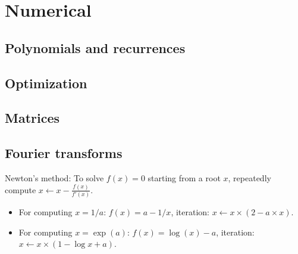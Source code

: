 \chapter{Numerical}

\section{Polynomials and recurrences}

\section{Optimization}

\section{Matrices}

\section{Fourier transforms}
	Newton's method: To solve $f(x) = 0$ starting from a root $x$, repeatedly compute
	$x \leftarrow x - \frac{f(x)}{f'(x)}$.
	\begin{itemize}
	  \item For computing $x=1/a$: $f(x) = a-1/x$, iteration: $x \leftarrow x\times (2-a\times x)$.
	  \item For computing $x=\exp(a)$: $f(x) = \log(x)-a$, iteration: $x \leftarrow x\times (1-\log x+a)$.
	\end{itemize}
